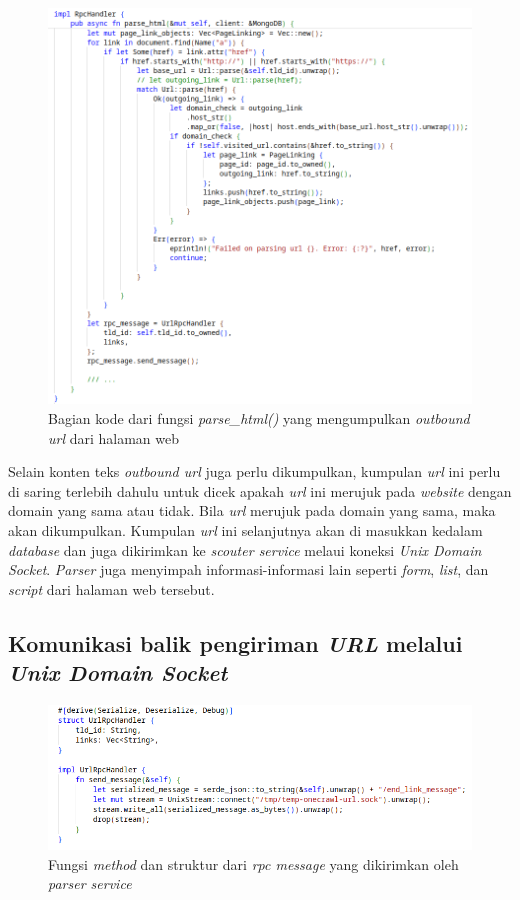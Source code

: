 \begin{figure}[H]
  \centering
  \includegraphics[keepaspectratio, width=12cm]{gambar/parse-link-gathering.png}
  \caption{Bagian kode dari fungsi \emph{parse\_html()} yang mengumpulkan \emph{outbound url} dari halaman web}
  \label{gambar:parse-link-gathering}
\end{figure}

Selain konten teks \emph{outbound url} juga perlu dikumpulkan, kumpulan \emph{url} ini perlu di saring terlebih dahulu untuk dicek apakah \emph{url} ini merujuk pada \emph{website} dengan domain yang sama atau tidak. Bila \emph{url} merujuk pada domain yang sama, maka akan dikumpulkan. Kumpulan \emph{url} ini selanjutnya akan di masukkan kedalam \emph{database} dan juga dikirimkan ke \emph{scouter service} melaui koneksi \emph{Unix Domain Socket}. \emph{Parser} juga menyimpah informasi-informasi lain seperti \emph{form}, \emph{list}, dan \emph{script} dari halaman web tersebut.

\subsection{Komunikasi balik pengiriman \emph{URL} melalui \emph{Unix Domain Socket}}

\begin{figure}[H]
  \centering
  \includegraphics[keepaspectratio, width=14cm]{gambar/parser-udp-send-message.png}
  \caption{Fungsi \emph{method} dan struktur dari \emph{rpc message} yang dikirimkan oleh \emph{parser service}}
  \label{gambar:parse-send-message}
\end{figure}


